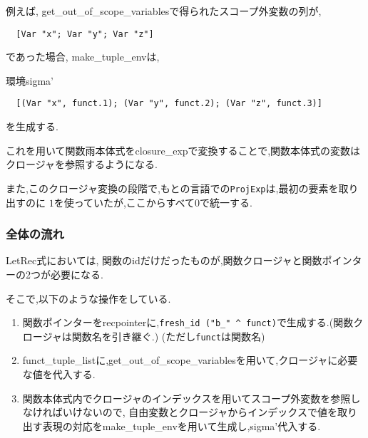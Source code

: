 例えば, get\_out\_of\_scope\_variablesで得られたスコープ外変数の列が,

\begin{lstlisting}
  [Var "x"; Var "y"; Var "z"]
\end{lstlisting}

であった場合, make\_tuple\_envは,

環境sigma'

\begin{lstlisting}
  [(Var "x", funct.1); (Var "y", funct.2); (Var "z", funct.3)]
\end{lstlisting}

を生成する.

これを用いて関数雨本体式をclosure\_expで変換することで,関数本体式の変数はクロージャを参照するようになる.

また,このクロージャ変換の段階で,もとの言語での\lstinline{ProjExp}は,最初の要素を取り出すのに $1$を使っていたが,ここからすべて$0$で統一する.

\subsubsection*{全体の流れ}

LetRec式においては, 関数のidだけだったものが,関数クロージャと関数ポインターの2つが必要になる. 

そこで,以下のような操作をしている.

\begin{enumerate}
\item 関数ポインターをrecpointerに,\lstinline{fresh_id ("b_" ^ funct)}で生成する.(関数クロージャは関数名を引き継ぐ.) (ただし\lstinline{funct}は関数名)

\item funct\_tuple\_listに,get\_out\_of\_scope\_variablesを用いて,クロージャに必要な値を代入する.
\item 関数本体式内でクロージャのインデックスを用いてスコープ外変数を参照しなければいけないので, 自由変数とクロージャからインデックスで値を取り出す表現の対応をmake\_tuple\_envを用いて生成し,sigma'代入する.
\end{enumerate}

